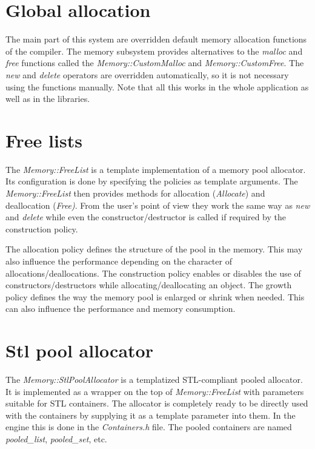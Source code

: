 \documentclass[a4paper, 12pt]{report}
\begin{document}
\section{Global allocation}
The main part of this system are overridden default memory allocation functions of the compiler. The memory subsystem provides alternatives to the \emph{malloc} and \emph{free} functions called the \emph{Memory::CustomMalloc} and \emph{Memory\-::\-Custom\-Free}. The \emph{new} and \emph{delete} operators are overridden automatically, so it is not necessary using the functions manually. Note that all this works in the whole application as well as in the libraries.

\section{Free lists}
The \emph{Memory::FreeList} is a template implementation of a memory pool allocator. Its configuration is done by specifying the policies as template arguments. The \emph{Memory::FreeList} then provides methods for allocation (\emph{Allocate}) and deallocation (\emph{Free)}. From the user's point of view they work the same way as \emph{new} and \emph{delete} while even the constructor/destructor is called if required by the construction policy.

The allocation policy defines the structure of the pool in the memory. This may also influence the performance depending on the character of allocations/deallocations. The construction policy enables or disables the use of constructors/destructors while allocating/deallocating an object. The growth policy defines the way the memory pool is enlarged or shrink when needed. This can also influence the performance and memory consumption.

\section{Stl pool allocator}
The \emph{Memory::StlPoolAllocator} is a templatized STL-compliant pooled allocator. It is implemented as a wrapper on the top of \emph{Memory::FreeList} with parameters suitable for STL containers. The allocator is completely ready to be directly used with the containers by supplying it as a template parameter into them. In the engine this is done in the \emph{Containers.h} file. The pooled containers are named \emph{pooled\_list}, \emph{pooled\_set}, etc.
\end{document}
